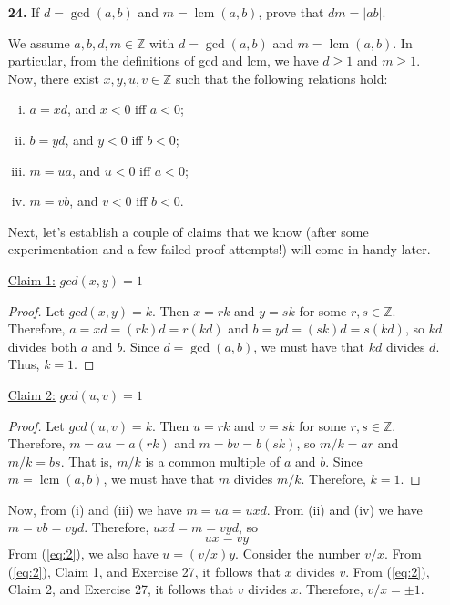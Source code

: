 \documentclass[12pt,reqno]{amsart}
\newcommand{\Z}{\ensuremath{\mathbb{Z}}}
\newcommand{\lcm}{\operatorname{lcm}}
\begin{document}
\begin{enumerate}
\bigskip

\item[{\bf 24.}]
If $d= \gcd(a, b)$ and $m = \lcm(a, b)$, prove that $dm = |ab|$.

\medskip

We assume $a, b, d, m \in \Z$ with $d= \gcd(a, b)$
and $m = \lcm(a, b)$. In particular, from the definitions of gcd and lcm, we
have $d\geq 1$ and $m \geq 1$. Now, there exist $x, y, u, v \in \Z$ such that
the following relations hold:
\begin{enumerate}[(i)]
\item \label{it:1}
$a = xd$, and $x<0$ iff $a<0$;
\item \label{it:2}
$b = yd$, and $y<0$ iff $b<0$;
\item \label{it:3}
$m = ua$, and $u<0$ iff $a<0$;
\item \label{it:4}
$m = vb$, and $v<0$ iff $b<0$.
\end{enumerate}

Next, let's establish a couple of claims that we know (after some
experimentation and a few failed proof attempts!) will come in handy later.

\medskip

\noindent \underline{Claim 1:} $gcd(x,y) = 1$
\begin{proof}
Let $gcd(x,y) = k$.  Then $x = rk$ and $y = sk$ for some $r, s\in \Z$. 
Therefore, $a = xd = (rk)d = r(kd)$
and $b = yd = (sk)d = s(kd)$, so $kd$ divides both $a$ and $b$.  
Since $d = \gcd(a, b)$, we must have that $kd$ divides $d$.  Thus, $k=1$.
\end{proof}

\noindent \underline{Claim 2:} $gcd(u,v) = 1$
\begin{proof}
Let $gcd(u,v) = k$.  Then $u = rk$ and $v = sk$ for some $r, s\in \Z$. 
Therefore, $m = au = a(rk)$ and $m = bv = b(sk)$, so $m/k = ar$ and $m/k = bs$.
That is, $m/k$ is a common multiple of $a$ and $b$.
Since $m = \lcm(a, b)$, we must have that $m$ divides $m/k$.  Therefore, $k=1$.
\end{proof}

\medskip

Now, from (i) and (iii) we have $m = ua = uxd$.
From (ii) and (iv) we have $m = vb = vyd$.  Therefore, 
$uxd = m = vyd$, so 
\begin{equation}
  \label{eq:2}
ux = vy
\end{equation}
From (\ref{eq:2}), we also have $u = (v/x) y$.  Consider the number $v/x$.
From (\ref{eq:2}), Claim 1, and Exercise 27, it follows that $x$ divides $v$.
From (\ref{eq:2}), Claim 2, and Exercise 27, it follows that $v$ divides $x$. 
Therefore, $v/x = \pm 1$.


\end{enumerate}
\end{document}
